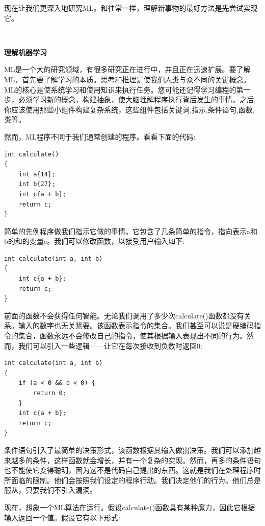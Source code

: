 现在让我们更深入地研究ML。和往常一样，理解新事物的最好方法是先尝试实现它。 \par

\noindent\textbf{}\ \par
\textbf{理解机器学习} \ \par
ML是一个大的研究领域，有很多研究正在进行中，并且正在迅速扩展。要了解ML，首先要了解学习的本质。思考和推理是使我们人类与众不同的关键概念。ML的核心是使系统学习和使用知识来执行任务。您可能还记得学习编程的第一步，必须学习新的概念，构建抽象，使大脑理解程序执行背后发生的事情。之后,你应该使用那些小组件构建复杂系统，这些组件包括关键词,指示,条件语句,函数,类等。 \par
然而，ML程序不同于我们通常创建的程序。看看下面的代码: \par

\begin{lstlisting}[caption={}]
int calculate()
{
	int a{14};
	int b{27};
	int c{a + b};
	return c;
}
\end{lstlisting}

简单的先例程序做我们指示它做的事情。它包含了几条简单的指令，指向表示a和b的和的变量c。我们可以修改函数，以接受用户输入如下: \par

\begin{lstlisting}[caption={}]
int calculate(int a, int b)
{
	int c{a + b};
	return c;
}
\end{lstlisting}

前面的函数不会获得任何智能。无论我们调用了多少次calculate()函数都没有关系。输入的数字也无关紧要。该函数表示指令的集合。我们甚至可以说是硬编码指令的集合，函数永远不会修改自己的指令，使其根据输入表现出不同的行为。然而，我们可以引入一些逻辑——让它在每次接收到负数时返回0: \par

\begin{lstlisting}[caption={}]
int calculate(int a, int b)
{
	if (a < 0 && b < 0) {
		return 0;
	}
	int c{a + b};
	return c;
}
\end{lstlisting}

条件语句引入了最简单的决策形式，该函数根据其输入做出决策。我们可以添加越来越多的条件，这样函数就会增长，并有一个复杂的实现。然而，再多的条件语句也不能使它变得聪明，因为这不是代码自己提出的东西。这就是我们在处理程序时所面临的限制。他们会按照我们设定的程序行动。我们决定他们的行为。他们总是服从，只要我们不引入漏洞。 \par
现在，想象一个ML算法在运行。假设calculate()函数具有某种魔力，因此它根据输入返回一个值。假设它有以下形式: \par

